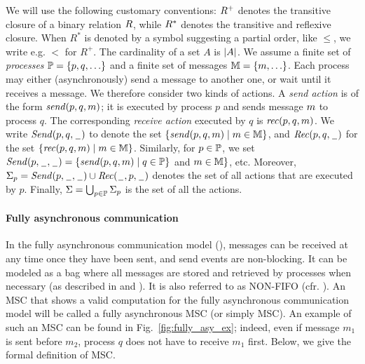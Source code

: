 We will use the following customary conventions:  $\mathbin{R}^+$ denotes the transitive closure of a binary relation $\mathbin{R}$, while $\mathbin{R}^*$ denotes the transitive and reflexive closure. When $R^*$ is denoted by a symbol suggesting 
a partial order, like $\leq$, we write e.g. 
$<$ for $R^+$.  The cardinality of a set $A$ is  $| A |$.
%
We assume a finite set of \emph{processes} $\mathbb{P}=\{p,q,\ldots\}$ and a finite set of messages $\mathbb{M}=\{m,\ldots\}$.
Each process may either (asynchronously) send a message to another one, or wait until it receives a message.
We therefore consider two kinds of actions. A \emph{send action} is of the form $\mathit{send}(p, q, m)$;
it is executed by process $p$ and sends message $m$ to process $q$.
The corresponding \emph{receive action} executed by $q$ is $\mathit{rec}(p, q, m)$.
%
We write ${\mathit{Send}(p,q,\hspace{0.1em}\underline{\hspace{0.5em}}\hspace{0.1em})}$ to denote the set $\{\mathit{send}(p, q, m) \mid m \in \mathbb{M}\}$, and
${\mathit{Rec}(p,q,\hspace{0.1em}\underline{\hspace{0.5em}}\hspace{0.1em})}$ for the set $\{\mathit{rec}(p, q, m) \mid m \in \mathbb{M}\}$.
Similarly, for $p \in \mathbb{P}$, we set
${\mathit{Send}(p,\hspace{0.1em}\underline{\hspace{0.5em}}\hspace{0.1em},\hspace{0.1em}\underline{\hspace{0.5em}}\hspace{0.1em})} = \{\mathit{send}(p, q, m) \mid q \in \mathbb{P}
\}$ and $m \in \mathbb{M}\}$, etc.
Moreover, $\Sigma_{p} = {\mathit{Send}(p,\hspace{0.1em}\underline{\hspace{0.5em}}\hspace{0.1em},\hspace{0.1em}\underline{\hspace{0.5em}}\hspace{0.1em})} \cup {\mathit{Rec}(\hspace{0.1em}\underline{\hspace{0.5em}}\hspace{0.1em},p,\hspace{0.1em}\underline{\hspace{0.5em}}\hspace{0.1em})}$ denotes the set of all actions that are
executed by $p$.
Finally, $\Sigma = \bigcup_{p \in \mathbb{P}} \Sigma_{p}$
is the set of all the actions.


\paragraph{\bf Fully asynchronous communication}
In the fully asynchronous communication model (\asy), messages can be received at any time once they have been sent, and send events are non-blocking.
It can be modeled as a bag where all messages are stored and retrieved by processes when necessary (as described in \cite{DBLP:journals/fac/ChevrouHQ16} and \cite{DBLP:journals/tcs/BasuB16}).
It is also referred to as NON-FIFO (cfr.  \cite{DBLP:journals/dc/Charron-BostMT96}).
An MSC that shows a valid computation for the fully asynchronous communication model will be called a fully asynchronous MSC (or simply MSC). An example of such an MSC can be found in Fig.~\ref{fig:fully_asy_ex}; indeed, even if message $m_1$ is sent before $m_2$, process $q$ does not have to receive $m_1$ first. Below, we give the formal definition of MSC.

